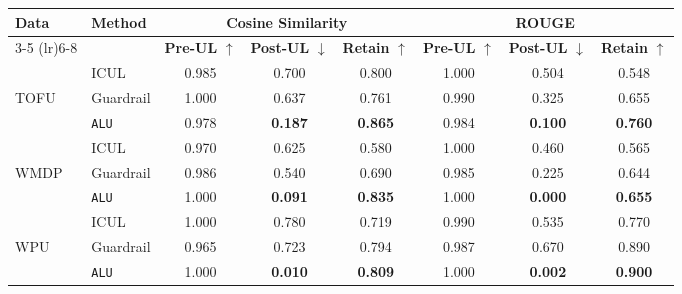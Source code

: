 \begin{table*}[]
    \centering
    \caption{Comparison of Methods using Cosine Similarity and ROUGE Metrics with Llama-3 8B}
    \begin{tabular}{llccc|ccc}
        \toprule
        \textbf{Data}&\textbf{Method} & \multicolumn{3}{c}{\textbf{Cosine Similarity}} & \multicolumn{3}{c}{\textbf{ROUGE}} \\
        \cmidrule(lr){3-5} \cmidrule(lr){6-8}
         & & \textbf{Pre-UL} $\uparrow$ & \textbf{Post-UL} $\downarrow$ & \textbf{Retain} $\uparrow$ & \textbf{Pre-UL} $\uparrow$ & \textbf{Post-UL} $\downarrow$ & \textbf{Retain} $\uparrow$ \\
        \midrule
        &ICUL & 0.985 & 0.700 & 0.800 & 1.000 & 0.504 & 0.548 \\
        TOFU &Guardrail & 1.000 & 0.637 & 0.761 & 0.990 & 0.325 & 0.655 \\
        &\texttt{ALU}  & 0.978 & \textbf{0.187} & \textbf{0.865} & 0.984 & \textbf{0.100} & \textbf{0.760} \\
        \midrule
        &ICUL  & 0.970 & 0.625 & 0.580 & 1.000 & 0.460 & 0.565 \\
        WMDP & Guardrail  & 0.986  & 0.540 & 0.690 & 0.985 & 0.225 & 0.644 \\
        &\texttt{ALU} & 1.000  & \textbf{0.091} & \textbf{0.835} & 1.000 & \textbf{0.000} & \textbf{0.655} \\
        \midrule
        &ICUL  & 1.000 & 0.780 & 0.719 & 0.990 & 0.535 & 0.770 \\
        WPU &Guardrail & 0.965 & 0.723 & 0.794 & 0.987 & 0.670 & 0.890 \\
        &\texttt{ALU} & 1.000 & \textbf{0.010} & \textbf{0.809} & 1.000 & \textbf{0.002} & \textbf{0.900} \\
        
        \bottomrule
    \end{tabular}
\label{tab:t11}    
\end{table*}

